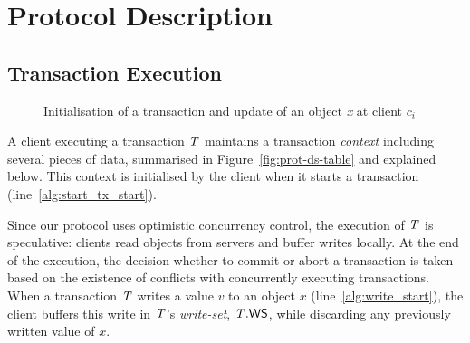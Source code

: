 \section{Protocol Description}


\subsection{Transaction Execution}

\begin{figure}[h]
\begin{algorithm}[H]
  \setcounter{AlgoLine}{0}

  \smallskip

\end{algorithm}
\caption{Initialisation of a transaction and update of an object \emph{x} at client $c_i$}
\end{figure}

A client executing a transaction $\mathit{T}$ maintains a transaction \emph{context} including several pieces of data, summarised in Figure~\ref{fig:prot-ds-table} and explained below. This context is initialised by the client when it starts a transaction (line~\ref{alg:start_tx_start}).

Since our protocol uses optimistic concurrency control, the execution of $\mathit{T}$ is speculative: clients read objects from servers and buffer writes locally. At the end of the execution, the decision whether to commit or abort a transaction is taken based on the existence of conflicts with concurrently executing transactions. When a transaction $\mathit{T}$ writes a value $v$ to an object $x$ (line~\ref{alg:write_start}), the client buffers this write in $\mathit{T}$'s \emph{write-set}, $\mathit{T}.\mathsf{WS}$, while discarding any previously written value of $x$.

